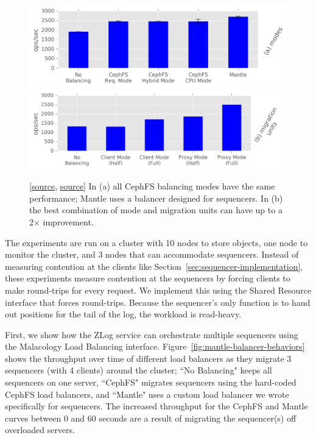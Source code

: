 \begin{figure}[t!]
\centering
\includegraphics{figures/mantle-balancer-performance.png}
\includegraphics{figures/mantle-mode-performance.png}
\caption{
[\href{https://github.com/michaelsevilla/malacology-popper/blob/v2.1/experiments/mds-zlog-seq-migrate-redux-3client/results-mantle-runs/visualize.ipynb}{source},
\href{https://github.com/michaelsevilla/malacology-popper/blob/v2.1/experiments/mds-zlog-seq-migrate-redux-waves/results-paper/visualize.ipynb}{source}]
In (a) all CephFS balancing modes have the same performance; Mantle uses a
balancer designed for sequencers. In (b) the best combination of mode and
migration units can have up to a 2\(\times\)
improvement.}\label{fig:mantle-balancer-performance}
\end{figure}

The experiments are run on a cluster with 10 nodes to store objects, one node
to monitor the cluster, and 3 nodes that can accommodate sequencers.  Instead
of measuring contention at the clients like
Section~\ref{sec:sequencer-implementation}, these experiments measure
contention at the sequencers by forcing clients to make round-trips for every
request. We implement this using the Shared Resource interface that forces
round-trips.  Because the sequencer's only function is to  hand out positions
for the tail of the log, the workload is read-heavy.

First, we show how the ZLog service can orchestrate multiple sequencers using
the Malacology Load Balancing interface.
Figure~\ref{fig:mantle-balancer-behaviors} shows the throughput over time of
different load balancers as they migrate 3 sequencers (with 4 clients) around
the cluster; ``No Balancing" keeps all sequencers on one server, ``CephFS"
migrates sequencers using the hard-coded CephFS load balancers, and ``Mantle" uses a
custom load balancer we wrote specifically for sequencers. 
The increased throughput for the CephFS and Mantle
curves between 0 and 60 seconds are a result of migrating the sequencer(s) off
overloaded servers.

